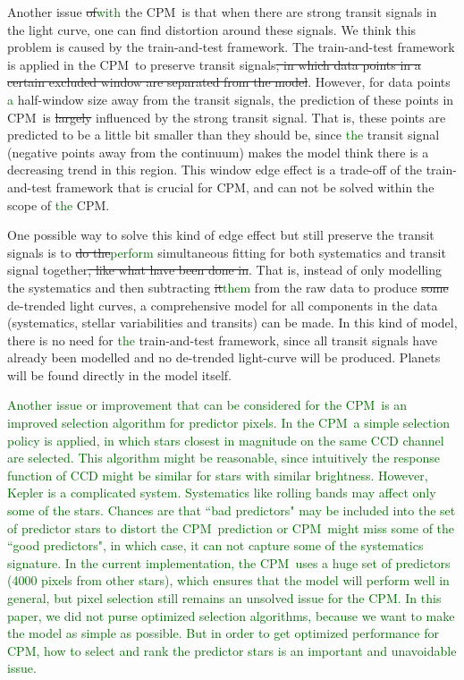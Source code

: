 \documentclass[12pt, preprint]{aastex}
\newcommand{\name}{CPM}
\newcommand{\revise}[1]{\textcolor{darkgreen}{#1}}
\newcommand{\remove}[1]{\sout{#1}}
\begin{document}
Another issue \remove{of}\revise{with} the \name\ is that when there are strong transit signals in the light curve, one can find distortion around these signals.
We think this problem is caused by the train-and-test framework.
The train-and-test framework is applied in the \name\ to preserve transit signals\remove{, in which data points in a certain excluded window are separated from the model}.
However, for data points \revise{a} half-window size away from the transit signals, the prediction of these points in \name\ is \remove{largely} influenced by the strong transit signal.
That is,  these points are predicted to be a little bit smaller than they should be, since \revise{the} transit signal (negative points away from the continuum) makes the model think there is a decreasing trend in this region.
This window edge effect is a trade-off of the train-and-test framework that is crucial for \name, and can not be solved within the scope of \revise{the} \name.

One possible way to solve this kind of edge effect but still preserve the transit signals is to \remove{do the}\revise{perform} simultaneous fitting for both systematics and transit signal together\remove{, like what have been done in}\citep{dfm}. 
That is,  instead of only modelling the systematics and then subtracting \remove{it}\revise{them} from the raw data to produce \remove{some }de-trended light curves, a comprehensive model for all components in the data (systematics, stellar variabilities and transits)  can be made. In this kind of model, there is no need for \revise{the} train-and-test framework, since all transit signals have already been modelled and no de-trended light-curve will be produced. Planets will be found directly in the model itself. 

\revise{Another issue or improvement that can be considered for the \name\ is an improved selection algorithm for predictor pixels. 
In the \name\, a simple selection policy is applied, in which stars closest in magnitude on the same CCD channel are selected. This algorithm might be reasonable, since intuitively the response function of CCD might be similar for stars with similar brightness. 
However, Kepler is a complicated system. Systematics like rolling bands \citep{handbook} may affect only some of the stars. Chances are that ``bad predictors" may be included into the set of predictor stars to distort the \name\ prediction or \name\ might miss some of the ``good predictors", in which case, it can not capture some of the systematics signature. In the current implementation, the \name\ uses a huge set of predictors (4000 pixels from other stars), which ensures that the model will perform well in general, but pixel selection still remains an unsolved issue for the \name.
In this paper, we did not purse optimized selection algorithms, because we want to make the model as simple as possible. But in order to get optimized performance for \name, how to select and rank the predictor stars is an important and unavoidable issue.}
\end{document}
